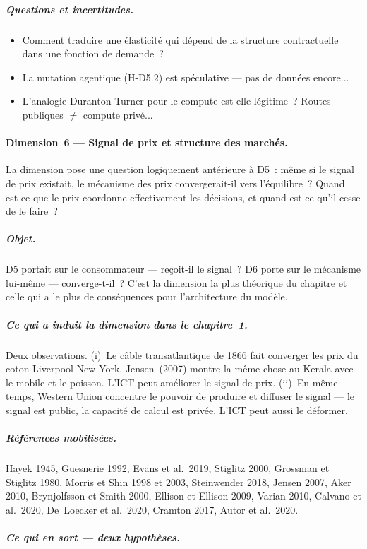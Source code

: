 \subparagraph{Questions et incertitudes.}
\begin{itemize}
\item Comment traduire une \'elasticit\'e qui d\'epend de la structure contractuelle dans une fonction de demande~? 
\item La mutation agentique (H-D5.2) est sp\'eculative --- pas de donn\'ees encore...
\item L'analogie Duranton-Turner pour le compute est-elle l\'egitime~? Routes publiques $\neq$ compute priv\'e...
\end{itemize}


\paragraph{Dimension~6 --- Signal de prix et structure des march\'es.}
La dimension pose une question logiquement ant\'erieure \`a D5~: m\^eme si le signal de prix existait, le m\'ecanisme des prix convergerait-il vers l'\'equilibre~? Quand est-ce que le prix coordonne effectivement les d\'ecisions, et quand est-ce qu'il cesse de le faire~?

\subparagraph{Objet.}
D5 portait sur le consommateur --- re\c{c}oit-il le signal~? D6 porte sur le m\'ecanisme lui-m\^eme --- converge-t-il~? C'est la dimension la plus th\'eorique du chapitre et celle qui a le plus de cons\'equences pour l'architecture du mod\`ele.

\subparagraph{Ce qui a induit la dimension dans le chapitre~1.}
Deux observations. (i)~Le c\^able transatlantique de 1866 fait converger les prix du coton Liverpool-New York. Jensen~(2007) montre la m\^eme chose au Kerala avec le mobile et le poisson. L'ICT peut am\'eliorer le signal de prix. (ii)~En m\^eme temps, Western Union concentre le pouvoir de produire et diffuser le signal --- le signal est public, la capacit\'e de calcul est priv\'ee. L'ICT peut aussi le d\'eformer.

\subparagraph{R\'ef\'erences mobilis\'ees.}
Hayek 1945, Guesnerie 1992, Evans et al.\ 2019, Stiglitz 2000, Grossman et Stiglitz 1980, Morris et Shin 1998 et 2003, Steinwender 2018, Jensen 2007, Aker 2010, Brynjolfsson et Smith 2000, Ellison et Ellison 2009, Varian 2010, Calvano et al.\ 2020, De~Loecker et al.\ 2020, Cramton 2017, Autor et al.\ 2020.

\subparagraph{Ce qui en sort --- deux hypoth\`eses.}

